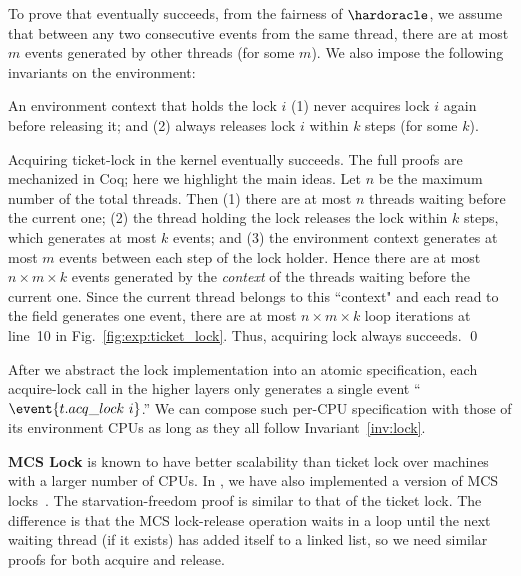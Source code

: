 To prove that  eventually succeeds, from the fairness
of $\hardoracle$, we assume that between any two consecutive events
from the same thread, there are at most $m$ events generated by other
threads (for some $m$). We also impose the following invariants on the
environment:
\begin{invariant}
\label{inv:lock}
An environment context that holds the lock $i$
(1) never acquires lock $i$ again before releasing it;
and (2) always releases lock $i$ within $k$ steps
(for some $k$).
\end{invariant}
\begin{lemma}
\label{lemma:lock}
Acquiring ticket-lock in the {\mCTOS} kernel eventually succeeds.
\proof 
The full proofs are mechanized
in Coq; here we highlight the main ideas.
Let $n$ be the maximum number of the total threads.  Then (1) there
are at most $n$ threads waiting before the current one; (2) the thread
holding the lock releases the lock within $k$ steps, which generates
at most $k$ events; and (3) the environment context generates at most $m$
events between each step of the lock holder.  Hence there are at most
$n\times m\times k$ events generated by the \emph{context} of the
threads waiting before the current one.  Since the current thread
belongs to this ``context" and each read to the  field
generates one  event, there are at most $n\times
m\times k$ loop iterations at line~10 in
Fig.~\ref{fig:exp:ticket_lock}.  Thus, acquiring lock always succeeds.
\qed
\end{lemma}
After we abstract the lock implementation into an atomic
specification, each acquire-lock call in the higher layers
only generates a single event ``$\event{t.acq\_lock\ i}$.'' We can
compose such per-CPU specification with those of its environment CPUs as long
as they all follow Invariant~\ref{inv:lock}.

\ignore{
\begin{figure}
 = C, multicols=2] {source_code/mcs_lock.c}
\caption{MCS Lock Implementation}
\label{fig:exp:mcs_lock}
\end{figure}
}

\textbf{MCS Lock} is known to have better scalability than ticket lock
over machines with a larger number of CPUs.  In {\mCTOS}, we have also
implemented a version of MCS locks~\cite{mcs91}.
The starvation-freedom proof is similar to that of the ticket lock.
The difference is that the MCS lock-release operation waits in a loop
until the next waiting thread (if it exists) has added itself to a
linked list, so we need similar proofs for both acquire and release.

